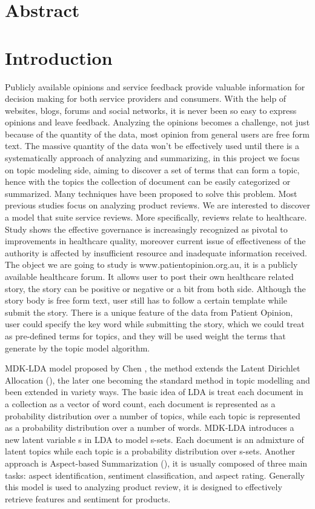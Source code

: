 \documentclass[11pt,twoside]{report}
\begin{document}
\chapter*{Abstract}

\chapter{Introduction}
Publicly available opinions and service feedback provide valuable information for decision making for both service providers and consumers. With the help of websites, blogs, forums and social networks, it is never been so easy to express opinions and leave feedback. Analyzing the opinions becomes a challenge, not just because of the quantity of the data, most opinion from general users are free form text. The massive quantity of the data won’t be effectively used until there is a systematically approach of analyzing and summarizing, in this project we focus on topic modeling side, aiming to discover a set of terms that can form a topic, hence with the topics the collection of document can be easily categorized or summarized. Many techniques have been proposed to solve this problem. Most previous studies focus on analyzing product reviews. We are interested to discover a model that suite service reviews. More specifically, reviews relate to healthcare. Study shows the effective governance is increasingly recognized as pivotal to improvements in healthcare quality\cite{ref6}, moreover current issue of effectiveness of the authority is affected by insufficient resource and inadequate information received\cite{ref5}. The object we are going to study is www.patientopinion.org.au, it is a publicly available healthcare forum. It allows user to post their own healthcare related story,  the story can be positive or negative or a bit from both side. Although the story body is free form text, user still has to follow a certain template while submit the story. There is a unique feature of the data from Patient Opinion, user could specify the key word while submitting the story, which we could treat as pre-defined terms for topics, and they will be used weight the terms that generate by the topic model algorithm. 

MDK-LDA model proposed by Chen\cite{ref24} , the method extends the Latent Dirichlet Allocation (\cite{ref25}), the later one becoming the standard method in topic modelling and been extended in variety ways. The basic idea of LDA is treat each document in a collection as a vector of word count, each document is represented as a probability distribution over a number of topics, while each topic is represented as a probability distribution over a number of words. MDK-LDA introduces a new latent variable s in LDA to model s-sets. Each document is an admixture of latent topics while each topic is a probability distribution over s-sets. Another approach is Aspect-based Summarization (\cite{ref11}), it is usually composed of three main tasks: aspect identification, sentiment classification, and aspect rating. Generally this model is used to analyzing product review, it is designed to effectively retrieve features and sentiment for products.
\end{document}
